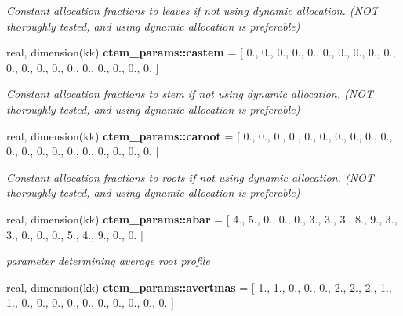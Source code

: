 \begin{DoxyCompactItemize}
\begin{DoxyCompactList}\small\item\em Constant allocation fractions to leaves if not using dynamic allocation. (N\+O\+T thoroughly tested, and using dynamic allocation is preferable) \end{DoxyCompactList}\item 
\hypertarget{namespacectem__params_aa2fad05936bda6d7d58531f2a19d1b7b}{}real, dimension(kk) {\bfseries ctem\+\_\+params\+::castem} = \mbox{[} 0., 0., 0., 0., 0., 0., 0., 0., 0., 0., 0., 0., 0., 0., 0., 0., 0., 0., 0., 0. \mbox{]}\label{namespacectem__params_aa2fad05936bda6d7d58531f2a19d1b7b}

\begin{DoxyCompactList}\small\item\em Constant allocation fractions to stem if not using dynamic allocation. (N\+O\+T thoroughly tested, and using dynamic allocation is preferable) \end{DoxyCompactList}\item 
\hypertarget{namespacectem__params_a80eaaf9535291c9113cb1014eea91ca6}{}real, dimension(kk) {\bfseries ctem\+\_\+params\+::caroot} = \mbox{[} 0., 0., 0., 0., 0., 0., 0., 0., 0., 0., 0., 0., 0., 0., 0., 0., 0., 0., 0., 0. \mbox{]}\label{namespacectem__params_a80eaaf9535291c9113cb1014eea91ca6}

\begin{DoxyCompactList}\small\item\em Constant allocation fractions to roots if not using dynamic allocation. (N\+O\+T thoroughly tested, and using dynamic allocation is preferable) \end{DoxyCompactList}\item 
\hypertarget{namespacectem__params_a80132ab7ebb5d63e27978d1a13df0b80}{}real, dimension(kk) {\bfseries ctem\+\_\+params\+::abar} = \mbox{[} 4., 5., 0., 0., 0., 3., 3., 3., 8., 9., 3., 3., 0., 0., 0., 5., 4., 9., 0., 0. \mbox{]}\label{namespacectem__params_a80132ab7ebb5d63e27978d1a13df0b80}

\begin{DoxyCompactList}\small\item\em parameter determining average root profile \end{DoxyCompactList}\item 
\hypertarget{namespacectem__params_ad1f59f53c14c2a0c09bfad6b11139bca}{}real, dimension(kk) {\bfseries ctem\+\_\+params\+::avertmas} = \mbox{[} 1., 1., 0., 0., 0., 2., 2., 2., 1., 1., 0., 0., 0., 0., 0., 0., 0., 0., 0., 0. \mbox{]}\label{namespacectem__params_ad1f59f53c14c2a0c09bfad6b11139bca}


\end{DoxyCompactItemize}
